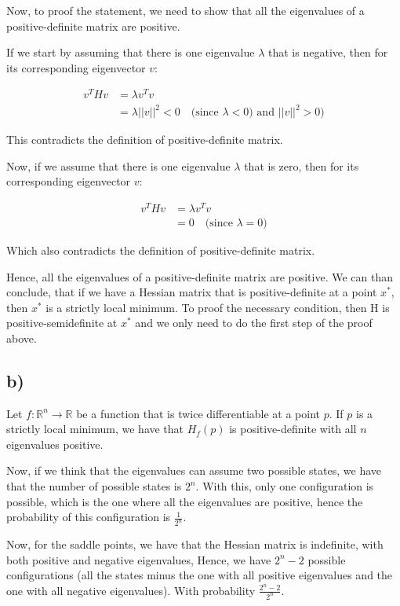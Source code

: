 \documentclass{article}
\begin{document}
Now, to proof the statement, we need to show that all the eigenvalues of a positive-definite matrix are positive.

If we start by assuming that there is one eigenvalue $\lambda$ that is negative, then for its corresponding eigenvector $v$:

\begin{align*}
    v^T H v &= \lambda v^T v \\
    &= \lambda ||v||^2 < 0 \quad \text{(since $\lambda < 0$) and $||v||^2 > 0$)}
\end{align*}

This contradicts the definition of positive-definite matrix.

Now, if we assume that there is one eigenvalue $\lambda$ that is zero, then for its corresponding eigenvector $v$:

\begin{align*}
    v^T H v &= \lambda v^T v \\
    &= 0 \quad \text{(since $\lambda = 0$)}
\end{align*}

Which also contradicts the definition of positive-definite matrix.

Hence, all the eigenvalues of a positive-definite matrix are positive. We can than conclude, that
if we have a Hessian matrix that is positive-definite at a point $x^*$, then $x^*$ is a strictly local minimum.
To proof the necessary condition, then H is positive-semidefinite at $x^*$ and we only need to do the first step of the proof
above. 

\subsection*{b)}

Let $f: \mathbb{R}^n \rightarrow \mathbb{R}$ be a function that is twice differentiable at a point $p$. If $p$
is a strictly local minimum, we have that $H_f(p)$ is positive-definite with all $n$ eigenvalues positive.

Now, if we think that the eigenvalues can assume two possible states, we have that the number of possible states is $2^n$.
With this, only one configuration is possible, which is the one where all the eigenvalues are positive, hence
the probability of this configuration is $\frac{1}{2^n}$.

Now, for the saddle points, we have that the Hessian matrix is indefinite, with both positive and negative eigenvalues, Hence,
we have $2^n - 2$ possible configurations (all the states minus the one with all positive eigenvalues and the one with all negative eigenvalues). With
probability $\frac{2^n - 2}{2^n}$. 
\end{document}

